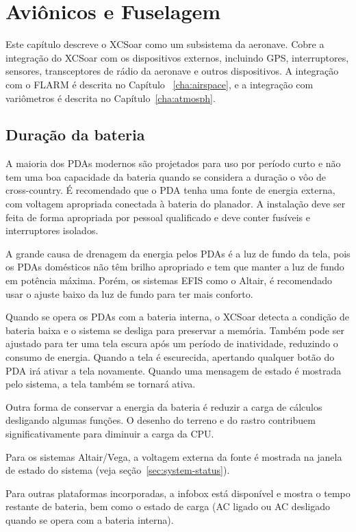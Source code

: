 \chapter{Aviônicos e Fuselagem}\label{cha:avionics-airframe}

Este capítulo descreve o XCSoar como um subsistema da aeronave.  Cobre a integração do XCSoar com os dispositivos externos, incluindo GPS, interruptores, sensores, transceptores de rádio da aeronave e outros dispositivos.  A integração com o FLARM é descrita no Capítulo ~\ref{cha:airspace}, e a integração com variômetros é descrita no Capítulo~\ref{cha:atmosph}.

\section{Duração da bateria}

A maioria dos PDAs modernos são projetados para uso por período curto e não tem uma boa capacidade da bateria quando se considera a duração o vôo de cross-country.  É recomendado que o PDA tenha uma fonte de energia externa, com voltagem apropriada conectada à bateria do planador.  A instalação deve ser feita de forma apropriada por pessoal qualificado e deve conter fusíveis e interruptores isolados.

A grande causa de drenagem da energia pelos PDAs é a luz de fundo da tela, pois os PDAs domésticos não têm brilho apropriado e tem que manter a luz de fundo em potência máxima.  Porém, os sistemas EFIS como o Altair, é recomendado usar o ajuste baixo da luz de fundo para ter mais conforto.

Quando se opera os PDAs com a bateria interna, o XCSoar detecta a condição de bateria baixa e o sistema se desliga para preservar a memória.  Também pode ser ajustado para ter uma tela escura após um período de inatividade, reduzindo o consumo de energia.  Quando a tela é escurecida, apertando qualquer botão do PDA irá ativar a tela novamente.  Quando uma mensagem de estado é mostrada pelo sistema, a tela também se tornará ativa.

Outra forma de conservar a energia da bateria é reduzir a carga de cálculos desligando algumas funções.  O desenho do terreno e do rastro contribuem significativamente para diminuir a carga da CPU.

Para os sistemas Altair/Vega, a voltagem externa da fonte é mostrada na janela de estado do sistema (veja seção~\ref{sec:system-status}).

Para outras plataformas incorporadas, a infobox  está disponível e mostra o tempo restante de bateria, bem como o estado de carga (AC ligado ou AC desligado quando se opera com a bateria interna).  

